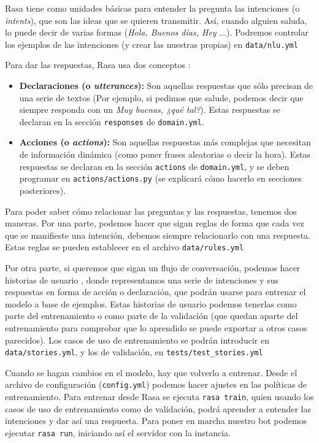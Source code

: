 Rasa tiene como unidades básicas para entender la pregunta las intenciones (o \textit{intents}), que son las ideas que se quieren transmitir. Así, cuando alguien saluda, lo puede decir de varias formas (\textit{Hola, Buenos días, Hey} ...). Podremos controlar los ejemplos de las intenciones (y crear las nuestras propias) en \texttt{data/nlu.yml}

Para dar las respuestas, Rasa usa dos conceptos \cite{rasa-respuestas}:
\begin{itemize}
	\item \textbf{Declaraciones (o \textit{utterances}):} Son aquellas respuestas que sólo precisan de una serie de textos (Por ejemplo, si pedimos que salude, podemos decir que siempre responda con un \textit{Muy buenas, ¿qué tal?}). Estas respuestas se declaran en la sección \texttt{responses} de \texttt{domain.yml}.
	\item \textbf{Acciones (o \textit{actions}):} Son aquellas respuestas más complejas que necesitan de información dinámica (como poner frases aleatorias o decir la hora). Estas respuestas se declaran en la sección \texttt{actions} de \texttt{domain.yml}, y se deben programar en \texttt{actions/actions.py} (se explicará cómo hacerlo en secciones posteriores).
\end{itemize}

Para poder saber cómo relacionar las preguntas y las respuestas, tenemos dos maneras. Por una parte, podemos hacer que sigan reglas \cite{rasa-rules} de forma que cada vez que se manifieste una intención, debemos siempre relacionarlo con una respuesta. Estas reglas se pueden establecer en el archivo \texttt{data/rules.yml}

Por otra parte, si queremos que sigan un flujo de conversación, podemos hacer historias de usuario \cite{rasa-stories}, donde representamos una serie de intenciones y sus respuestas en forma de acción o declaración, que podrán usarse para entrenar el modelo a base de ejemplos. Estas historias de usuario podemos tenerlas como parte del entrenamiento o como parte de la validación (que quedan aparte del entrenamiento para comprobar que lo aprendido se puede exportar a otros casos parecidos). Los casos de uso de entrenamiento se podrán introducir en \texttt{data/stories.yml}, y los de validación, en \texttt{tests/test\_stories.yml}

Cuando se hagan cambios en el modelo, hay que volverlo a entrenar. Desde el archivo de configuración (\texttt{config.yml}) podemos hacer ajustes en las políticas de entrenamiento.
Para entrenar desde Rasa se ejecuta \texttt{rasa train}, quien usando los casos de uso de entrenamiento como de validación, podrá aprender a entender las intenciones y dar así una respuesta.
Para poner en marcha nuestro bot podemos ejecutar \texttt{rasa run}, iniciando así el servidor con la instancia.



